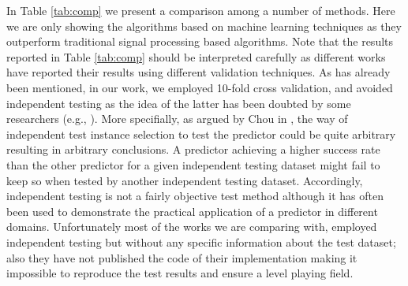 \documentclass[12pt,a4paper]{article}
\begin{document}
In Table \ref{tab:comp} we present a comparison among a number of methods. Here we are only showing the algorithms based on machine learning techniques as they outperform traditional signal processing based algorithms. Note that the results reported in Table \ref{tab:comp} should be interpreted carefully as different works have reported their results using different validation techniques. As has already been mentioned, in our work, we employed 10-fold cross validation, and avoided independent testing as the idea of the latter has been doubted by some researchers (e.g., \cite{chou2011some}). More specifially, as argued by Chou in \cite{chou2011some}, the way of independent test instance selection to test the predictor could be quite arbitrary resulting in arbitrary conclusions. A predictor achieving a higher success rate than the other predictor for a given independent testing dataset might fail to keep so when tested by another independent testing dataset. Accordingly, independent testing is not a fairly objective test method although it has often been used to demonstrate the practical application of a predictor in different domains. Unfortunately most of the works we are comparing with, employed  independent testing but without any specific information about the test dataset; also they have not published the code of their implementation making it impossible to reproduce the test results and ensure a level playing field. 
	
\end{document}
